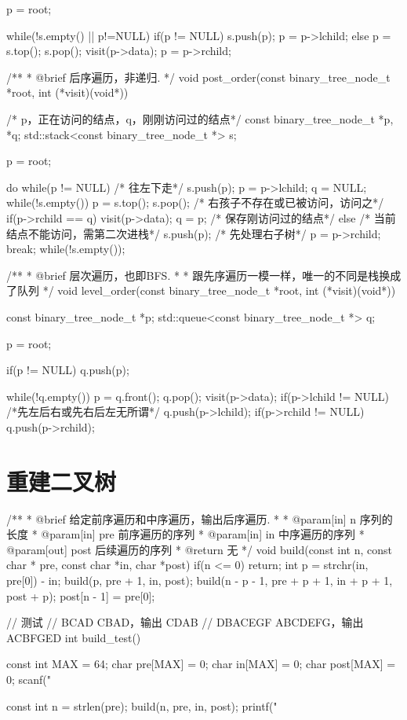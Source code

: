 \begin{Codex}[label=binary_tree.cpp]
{    p = root;

    while(!s.empty() || p!=NULL) {
        if(p != NULL) {
            s.push(p);
            p = p->lchild;
        } else {
            p = s.top();
            s.pop();
            visit(p->data);
            p = p->rchild;
        }
    }
}

/** 
 * @brief 后序遍历，非递归.
 */
void post_order(const binary_tree_node_t *root, 
                int (*visit)(void*)) {
    /* p，正在访问的结点，q，刚刚访问过的结点*/
    const binary_tree_node_t *p, *q;
    std::stack<const binary_tree_node_t *> s;

    p = root;

    do {
        while(p != NULL) { /* 往左下走*/
            s.push(p);
            p = p->lchild;
        }
        q = NULL;
        while(!s.empty()) {
            p = s.top();
            s.pop();
            /* 右孩子不存在或已被访问，访问之*/
            if(p->rchild == q) {
                visit(p->data);
                q = p; /* 保存刚访问过的结点*/
            } else {
                /* 当前结点不能访问，需第二次进栈*/
                s.push(p);
                /* 先处理右子树*/
                p = p->rchild;
                break;
            }
        }
    }while(!s.empty());
}

/** 
 * @brief 层次遍历，也即BFS.
 *
 * 跟先序遍历一模一样，唯一的不同是栈换成了队列
 */
void level_order(const binary_tree_node_t *root, 
                 int (*visit)(void*)) {
    const binary_tree_node_t *p;
    std::queue<const binary_tree_node_t *> q;

    p = root;

    if(p != NULL) {
        q.push(p);
    }

    while(!q.empty()) {
        p = q.front();
        q.pop();
        visit(p->data);
        if(p->lchild != NULL) { /*先左后右或先右后左无所谓*/
            q.push(p->lchild);
        }
        if(p->rchild != NULL) {
            q.push(p->rchild);
        }
    }
}
\end{Codex}

\section{重建二叉树} %
\begin{Codex}[label=binary_tree.cpp]
/** 
 * @brief 给定前序遍历和中序遍历，输出后序遍历.
 *
 * @param[in] n 序列的长度
 * @param[in] pre 前序遍历的序列
 * @param[in] in 中序遍历的序列
 * @param[out] post 后续遍历的序列
 * @return 无
 */
void build(const int n, const char * pre, const char *in, char *post) {
	if(n <= 0) return;
	int p = strchr(in, pre[0]) - in;
	build(p, pre + 1, in, post);
	build(n - p - 1, pre + p + 1, in + p + 1, post + p);
	post[n - 1] = pre[0];
}

// 测试
// BCAD CBAD，输出 CDAB
// DBACEGF ABCDEFG，输出 ACBFGED
int build_test() {
    const int MAX = 64;
    char pre[MAX] = {0};
    char in[MAX] = {0};
    char post[MAX] = {0};
    scanf("%
    
    const int n = strlen(pre);
    build(n, pre, in, post);
    printf("%
}
\end{Codex}

